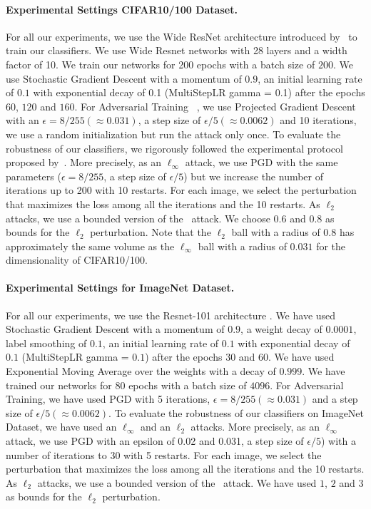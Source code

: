 \paragraph{Experimental Settings CIFAR10/100 Dataset.}
For all our experiments, we use the Wide ResNet architecture introduced by~\citet{zagoruyko2016wide} to train our classifiers.
We use Wide Resnet networks with 28 layers and a width factor of 10.
We train our networks for 200 epochs with a batch size of $200$.
We use Stochastic Gradient Descent with a momentum of $0.9$, an initial learning rate of $0.1$ with exponential decay of 0.1 (MultiStepLR gamma = 0.1) after the epochs $60$, $120$ and $160$.
For Adversarial Training ~\cite{madry2018towards}, we use Projected Gradient Descent with an $\epsilon = 8/255 (\approx 0.031)$, a step size of $\epsilon/5 (\approx 0.0062)$ and 10 iterations, we use a random initialization but run the attack only once.
To evaluate the robustness of our classifiers, we rigorously followed the experimental protocol proposed by~\citet{carlini2019evaluating,tramer2020adaptive}.
More precisely, as an $\ell_\infty$ attack, we use PGD with the same parameters ($\epsilon = 8/255$, a step size of $\epsilon/5$) but we increase the number of iterations up to 200 with 10 restarts.
For each image, we select the perturbation that maximizes the loss among all the iterations and the 10 restarts.
As $\ell_2$ attacks, we use a bounded version of the~\citet{carlini2017towards} attack.
We choose $0.6$ and $0.8$ as bounds for the $\ell_2$ perturbation.
Note that the $\ell_2$ ball with a radius of $0.8$ has approximately the same volume as the $\ell_\infty$ ball with a radius of $0.031$ for the dimensionality of CIFAR10/100.


\paragraph{Experimental Settings for ImageNet Dataset.}
For all our experiments, we use the Resnet-101 architecture \cite{he2016deep}.
We have used Stochastic Gradient Descent with a momentum of $0.9$, a weight decay of $0.0001$, label smoothing of $0.1$, an initial learning rate of $0.1$ with exponential decay of $0.1$ (MultiStepLR gamma = $0.1$) after the epochs $30$ and $60$.
We have used Exponential Moving Average over the weights with a decay of $0.999$.
We have trained our networks for 80 epochs with a batch size of $4096$.
For Adversarial Training, we have used PGD with 5 iterations, $\epsilon = 8/255 (\approx 0.031)$ and a step size of $\epsilon/5 (\approx 0.0062)$.
To evaluate the robustness of our classifiers on ImageNet Dataset, we have used an $\ell_\infty$ and an $\ell_2$ attacks.
More precisely, as an $\ell_\infty$ attack, we use PGD with an epsilon of 0.02 and 0.031, a step size of $\epsilon/5$) with a number of iterations to 30 with 5 restarts.
For each image, we select the perturbation that maximizes the loss among all the iterations and the 10 restarts.
As $\ell_2$ attacks, we use a bounded version of the~\citet{carlini2017towards} attack.
We have used $1$, $2$ and $3$ as bounds for the $\ell_2$ perturbation.



